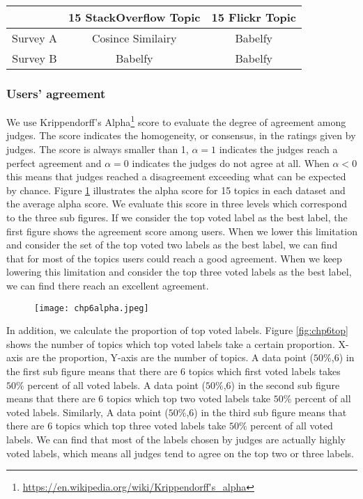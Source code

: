 \begin{table}[htp]
\centering
\begin{tabular}{c|c|c}
\hline
             &  15 StackOverflow Topic& 15 Flickr Topic \\ \hline
    Survey A & Cosince Similairy & Babelfy\\ \hline  
    Survey B &  Babelfy          & Babelfy\\ \hline
\end{tabular}
\label{tab:chp6survey}
\end{table}


\subsubsection{Users' agreement}
We use Krippendorff’s Alpha\footnote{\url{https://en.wikipedia.org/wiki/Krippendorff's_alpha}} score to evaluate the degree of agreement among judges. The score indicates the homogeneity, or consensus, in the ratings given by judges. The score is always smaller than 1, $\alpha = 1 $ indicates the judges reach a perfect agreement and $\alpha =0 $ indicates the judges do not agree at all. When $\alpha <0 $ this means that judges reached a disagreement exceeding what can be expected by chance.  Figure \ref{fig:chp6alpha} illustrates the alpha score for 15 topics in each dataset and the average alpha score. We evaluate this score in three levels which correspond to the three sub figures. If we consider the top voted label as the best label, the first figure shows the agreement score among users. When we lower this limitation and consider the set of the top voted two labels as the best label, we can find that for most of the topics users could reach a good agreement. When we keep lowering this limitation and consider the top three voted labels as the best label, we can find there reach an excellent agreement. 



\begin{figure}[htp]
\centering
\texttt{[image: chp6alpha.jpeg]}  
\caption{}
\label{fig:chp6alpha} 
\end{figure}


In addition, we calculate the proportion of top voted labels. Figure \ref{fig:chp6top} shows the number of topics which top voted labels take a certain proportion. X-axis are the proportion, Y-axis are the number of topics. A data point ($50\%$,6) in the first sub figure means that there are 6 topics which first voted labels takes $50\%$ percent of all voted labels. A data point ($50\%$,6) in the second sub figure means that there are 6 topics which top two voted labels take $50\%$ percent of all voted labels. Similarly, A data point ($50\%$,6) in the third sub figure means that there are 6 topics which top three voted labels take $50\%$ percent of all voted labels. We can find that most of the labels chosen by judges are actually highly voted labels, which means all judges tend to agree on the top two or three labels.


